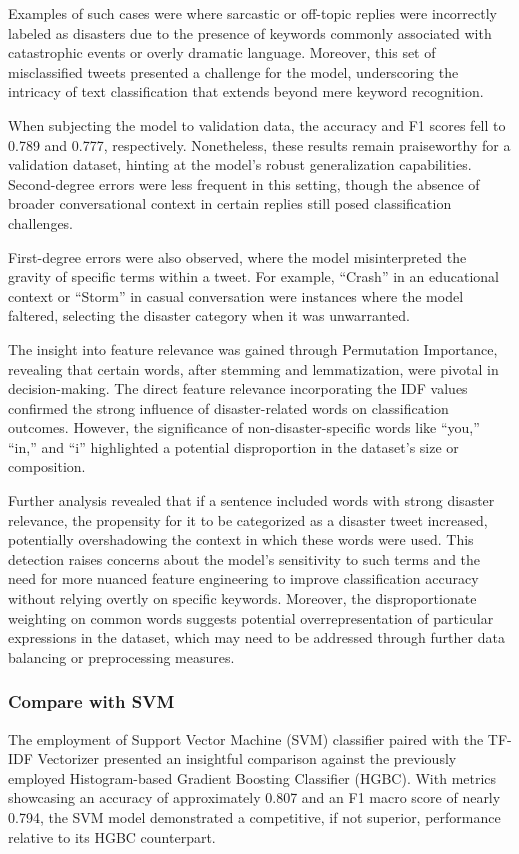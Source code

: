 \documentclass[10pt,table]{article}
\begin{document}
Examples of such cases were where sarcastic or off-topic replies were incorrectly labeled as disasters due to the presence of keywords commonly associated with catastrophic events or overly dramatic language. Moreover, this set of misclassified tweets presented a challenge for the model, underscoring the intricacy of text classification that extends beyond mere keyword recognition.

When subjecting the model to validation data, the accuracy and F1 scores fell to 0.789 and 0.777, respectively. Nonetheless, these results remain praiseworthy for a validation dataset, hinting at the model's robust generalization capabilities. Second-degree errors were less frequent in this setting, though the absence of broader conversational context in certain replies still posed classification challenges.

First-degree errors were also observed, where the model misinterpreted the gravity of specific terms within a tweet. For example, \enquote{Crash} in an educational context or \enquote{Storm} in casual conversation were instances where the model faltered, selecting the disaster category when it was unwarranted.

The insight into feature relevance was gained through Permutation Importance, revealing that certain words, after stemming and lemmatization, were pivotal in decision-making. The direct feature relevance incorporating the IDF values confirmed the strong influence of disaster-related words on classification outcomes. However, the significance of non-disaster-specific words like \enquote{you,} \enquote{in,} and \enquote{i} highlighted a potential disproportion in the dataset's size or composition.

Further analysis revealed that if a sentence included words with strong disaster relevance, the propensity for it to be categorized as a disaster tweet increased, potentially overshadowing the context in which these words were used. This detection raises concerns about the model's sensitivity to such terms and the need for more nuanced feature engineering to improve classification accuracy without relying overtly on specific keywords. Moreover, the disproportionate weighting on common words suggests potential overrepresentation of particular expressions in the dataset, which may need to be addressed through further data balancing or preprocessing measures.

\subsubsection{Compare with SVM}
The employment of Support Vector Machine (SVM) classifier paired with the TF-IDF Vectorizer presented an insightful comparison against the previously employed Histogram-based Gradient Boosting Classifier (HGBC). With metrics showcasing an accuracy of approximately 0.807 and an F1 macro score of nearly 0.794, the SVM model demonstrated a competitive, if not superior, performance relative to its HGBC counterpart.
\end{document}
